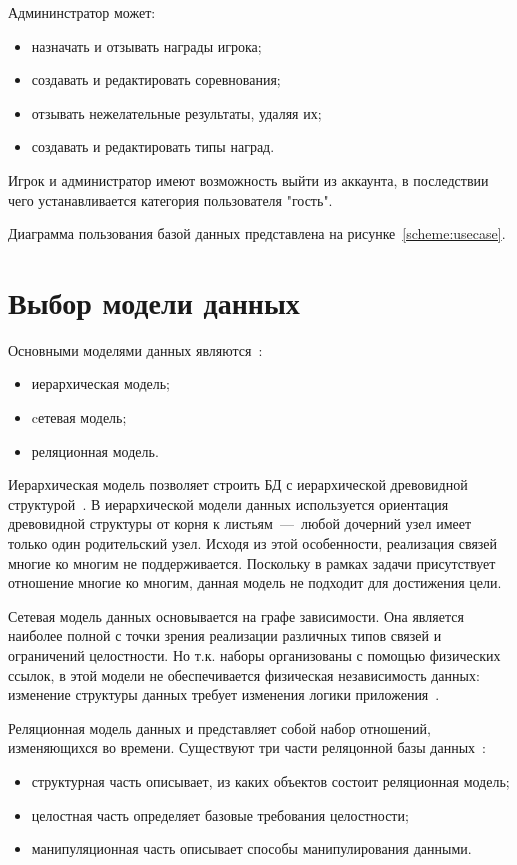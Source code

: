 Админинстратор может:
\begin{itemize}
	\item назначать и отзывать награды игрока;
	\item создавать и редактировать соревнования;
	\item отзывать нежелательные результаты, удаляя их;
	\item создавать и редактировать типы наград.
\end{itemize}

Игрок и администратор имеют возможность выйти из аккаунта, в последствии чего устанавливается категория пользователя "гость".

Диаграмма пользования базой данных представлена на рисунке~\ref{scheme:usecase}.


\section{Выбор модели данных}

Основными моделями данных являются~\cite{karpova}:
\begin{itemize}
	\item иерархическая модель;
	\item cетевая модель;
	\item реляционная модель.
\end{itemize}

Иерархическая модель позволяет строить БД с иерархической древовидной структурой~\cite{karpova}. В иерархической модели данных используется ориентация древовидной
структуры от корня к листьям~---~любой дочерний узел имеет только один родительский узел. Исходя из этой особенности, реализация связей многие ко многим не поддерживается.
Поскольку в рамках задачи присутствует отношение многие ко многим, данная модель не подходит для достижения цели.

Сетевая модель данных основывается на графе зависимости. Она является наиболее полной с точки зрения реализации различных типов связей и ограничений целостности. Но т.к. наборы организованы с помощью физических ссылок, в этой модели не обеспечивается физическая независимость данных: изменение структуры данных требует изменения логики приложения~\cite{karpova}.

Реляционная модель данных и представляет собой набор отношений, изменяющихся во времени. Существуют три части реляцонной базы данных~\cite{relationdb}:
\begin{itemize}
	\item структурная часть описывает, из каких объектов состоит реляционная модель;
	\item целостная часть определяет базовые требования целостности;
	\item манипуляционная часть описывает способы манипулирования данными.
\end{itemize}

